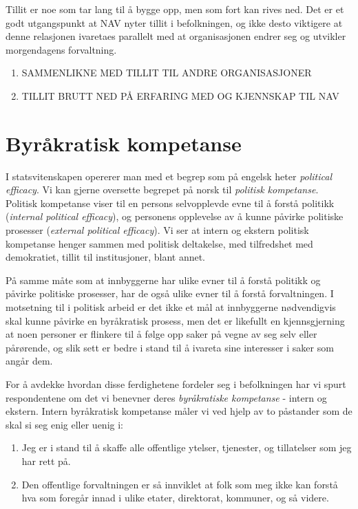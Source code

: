 \documentclass[
]{book}
\providecommand{\tightlist}{%
  \setlength{\itemsep}{0pt}\setlength{\parskip}{0pt}}
\begin{document}
Tillit er noe som tar lang til å bygge opp, men som fort kan rives ned.
Det er et godt utgangspunkt at NAV nyter tillit i befolkningen, og ikke desto viktigere at denne relasjonen ivaretaes parallelt med at organisasjonen endrer seg og utvikler morgendagens forvaltning.

\begin{enumerate}
\def\labelenumi{\arabic{enumi}.}
\tightlist
\item
  SAMMENLIKNE MED TILLIT TIL ANDRE ORGANISASJONER
\item
  TILLIT BRUTT NED PÅ ERFARING MED OG KJENNSKAP TIL NAV
\end{enumerate}

\hypertarget{byruxe5kratisk-kompetanse}{%
\section{Byråkratisk kompetanse}\label{byruxe5kratisk-kompetanse}}

I statsvitenskapen opererer man med et begrep som på engelsk heter \emph{political efficacy}.
Vi kan gjerne oversette begrepet på norsk til \emph{politisk kompetanse}.
Politisk kompetanse viser til en persons selvopplevde evne til å forstå politikk (\emph{internal political efficacy}), og personens opplevelse av å kunne påvirke politiske prosesser (\emph{external political efficacy}).
Vi ser at intern og ekstern politisk kompetanse henger sammen med politisk deltakelse, med tilfredshet med demokratiet, tillit til institusjoner, blant annet.

På samme måte som at innbyggerne har ulike evner til å forstå politikk og påvirke politiske prosesser, har de også ulike evner til å forstå forvaltningen.
I motsetning til i politisk arbeid er det ikke et mål at innbyggerne nødvendigvis skal kunne påvirke en byråkratisk prosess, men det er likefullt en kjennsgjerning at noen personer er flinkere til å følge opp saker på vegne av seg selv eller pårørende, og slik sett er bedre i stand til å ivareta sine interesser i saker som angår dem.

For å avdekke hvordan disse ferdighetene fordeler seg i befolkningen har vi spurt respondentene om det vi benevner deres \emph{byråkratiske kompetanse} - intern og ekstern.
Intern byråkratisk kompetanse måler vi ved hjelp av to påstander som de skal si seg enig eller uenig i:

\begin{enumerate}
\def\labelenumi{\arabic{enumi}.}
\item
  Jeg er i stand til å skaffe alle offentlige ytelser, tjenester, og tillatelser som jeg har rett på.
\item
  Den offentlige forvaltningen er så innviklet at folk som meg ikke kan forstå hva som foregår innad i ulike etater, direktorat, kommuner, og så videre.
\end{enumerate}
\end{document}
